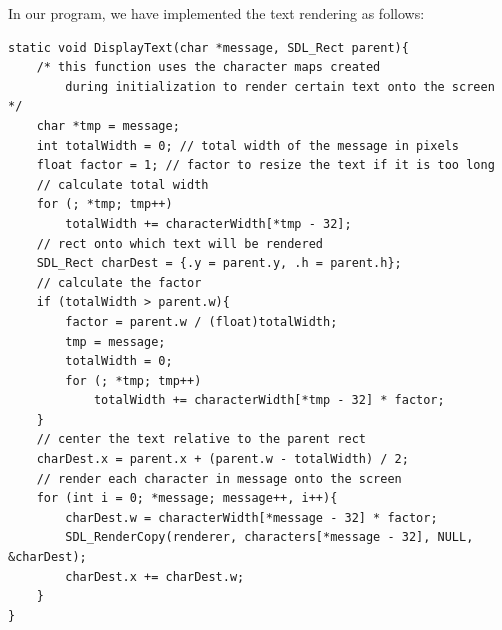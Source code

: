 \documentclass[report]{subfiles}
\begin{document}
    In our program, we have implemented the text rendering as follows:\\
    \begin{lstlisting}
static void DisplayText(char *message, SDL_Rect parent){
    /* this function uses the character maps created
        during initialization to render certain text onto the screen */
    char *tmp = message;
    int totalWidth = 0; // total width of the message in pixels 
    float factor = 1; // factor to resize the text if it is too long
    // calculate total width
    for (; *tmp; tmp++)
        totalWidth += characterWidth[*tmp - 32];
    // rect onto which text will be rendered
    SDL_Rect charDest = {.y = parent.y, .h = parent.h};
    // calculate the factor
    if (totalWidth > parent.w){
        factor = parent.w / (float)totalWidth;
        tmp = message;
        totalWidth = 0;
        for (; *tmp; tmp++)
            totalWidth += characterWidth[*tmp - 32] * factor;
    }
    // center the text relative to the parent rect
    charDest.x = parent.x + (parent.w - totalWidth) / 2;
    // render each character in message onto the screen
    for (int i = 0; *message; message++, i++){
        charDest.w = characterWidth[*message - 32] * factor;
        SDL_RenderCopy(renderer, characters[*message - 32], NULL, &charDest);
        charDest.x += charDest.w;
    }
}
    \end{lstlisting}
\end{document}
